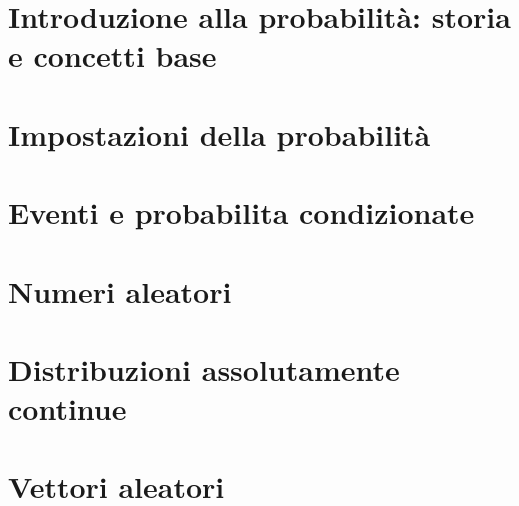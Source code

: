 \documentclass{article}
\begin{document}


\tableofcontents
\restoregeometry

\section{Introduzione alla probabilità: storia e concetti base}


\section{Impostazioni della probabilità}


\section{Eventi e probabilita condizionate}


\section{Numeri aleatori}


\section{Distribuzioni assolutamente continue}


\section{Vettori aleatori}

\end{document}
